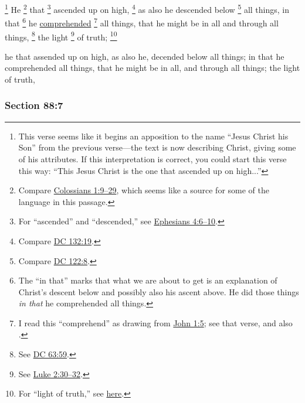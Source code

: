 			\footnote{%
				This verse seems like it begins an apposition to the name ``Jesus Christ his Son'' from the previous verse---the text is now describing Christ, giving some of his attributes. If this interpretation is correct, you could start this verse this way: ``This Jesus Christ is the one that ascended up on high...''
				}%
		He%
			\footnote{%
				Compare \hyperref[COLOSSIANS-1-9]{Colossians 1:9--29}, which seems like a source for some of the language in this passage.
				}
		that
			\footnote{%
				For ``ascended'' and ``descended,'' see \hyperref[EPHESIANS-4-6]{Ephesians 4:6--10}.
				}
		ascended up on high,%
			\footnote{%
				Compare \hyperref[DC132-19]{DC 132:19}.
				}
		as also he descended below%
			\footnote{%
				Compare \hyperref[DC122-8]{DC 122:8}.
				}
		all things, in that%
			\footnote{%
				The ``in that'' marks that what we are about to get is an explanation of Christ's descent below and possibly also his ascent above. He did those things \textit{in that} he comprehended all things.
				}
		he \hyperref[COMPREHEND]{comprehended}%
			\footnote{%
				I read this ``comprehend'' as drawing from \hyperref[JOHN-1-5]{John 1:5}; see that verse, and also \hyperref[KATALAMBANO]{}.
				}
		all things, that he might be in all and through all things,%
			\footnote{%
				See \hyperref[DC63-59]{DC 63:59}.
				}
		the light%
			\footnote{%
				See \hyperref[LUKE-2-30]{Luke 2:30--32}.
				}
		of truth;%
			\footnote{%
				For ``light of truth,'' see \hyperref[TRUTH-PHRASES]{here}.
				}

		\begin{framed}
		\scriptsize
			\begin{compactdesc}
				\item[JSP] he that assended up on high, as also he, decended below all things; in that he comprehended all things, that he might be in all, and through all things; the light of truth,
			\end{compactdesc}
		\end{framed}

	\subsubsection{Section 88:7} %
		\label{DC88-7}

